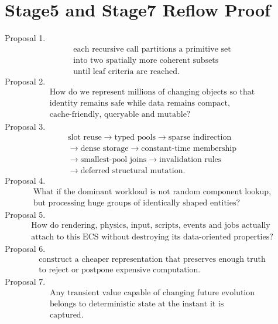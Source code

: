 \documentclass[11pt,twoside]{article}
\begin{document}
\section*{Stage5 and Stage7 Reflow Proof}
\noindent Proposal 1.
\[
\boxed{\begin{gathered}\text{each recursive call partitions a primitive set}\\\text{into two spatially more coherent subsets}\\\text{until leaf criteria are reached}.\end{gathered}}
\]
\clearpage
\noindent Proposal 2.
\[
\boxed{\begin{gathered}\text{How do we represent millions of changing objects so that}\\\text{identity remains safe while data remains compact,}\\\text{cache-friendly, queryable and mutable?}\end{gathered}}
\]
\clearpage
\noindent Proposal 3.
\[
\begin{gathered}\text{slot reuse}\rightarrow\text{typed pools}\rightarrow\text{sparse indirection}\\\rightarrow\text{dense storage}\rightarrow\text{constant-time membership}\\\rightarrow\text{smallest-pool joins}\rightarrow\text{invalidation rules}\\\rightarrow\text{deferred structural mutation}.\end{gathered}
\]
\clearpage
\noindent Proposal 4.
\[
\boxed{\begin{gathered}\text{What if the dominant workload is not random component lookup,}\\\text{but processing huge groups of identically shaped entities?}\end{gathered}}
\]
\clearpage
\noindent Proposal 5.
\[
\boxed{\begin{gathered}\text{How do rendering, physics, input, scripts, events and jobs actually}\\\text{attach to this ECS without destroying its data-oriented properties?}\end{gathered}}
\]
\clearpage
\noindent Proposal 6.
\[
\boxed{\begin{gathered}\text{construct a cheaper representation that preserves enough truth}\\\text{to reject or postpone expensive computation.}\end{gathered}}
\]
\clearpage
\noindent Proposal 7.
\[
\boxed{\begin{gathered}\text{Any transient value capable of changing future evolution}\\\text{belongs to deterministic state at the instant it is}\\\text{captured.}\end{gathered}}
\]
\end{document}
